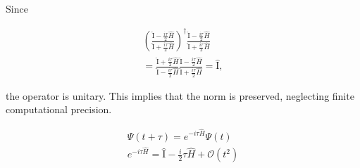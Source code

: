 Since

\begin{gather*}
\left(\frac{\hat{\mathrm{I}}-\frac{i\tau}{2}\hat{H}}{\hat{\mathrm{I}}+\frac{i\tau}{2}\hat{H}}\right)^{\dagger}\frac{\hat{\mathrm{I}}-\frac{i\tau}{2}\hat{H}}{\hat{\mathrm{I}}+\frac{i\tau}{2}\hat{H}}\\
= \frac{\hat{\mathrm{I}}+\frac{i\tau}{2}\hat{H}}{\hat{\mathrm{I}}-\frac{i\tau}{2}\hat{H}}\frac{\hat{\mathrm{I}}-\frac{i\tau}{2}\hat{H}}{\hat{\mathrm{I}}+\frac{i\tau}{2}\hat{H}} = \hat{\mathrm{I}},
\end{gather*}

the operator is unitary. This implies that the norm is preserved, neglecting finite computational precision.


\begin{gather*}
\Psi(t+\tau) = e^{-i\tau\hat{H}}\Psi(t)\\
e^{-i\tau\hat{H}} = \hat{\mathrm{I}}-\frac{i}{2}\tau\hat{H}+\mathcal{O}(t^2)
\end{gather*}